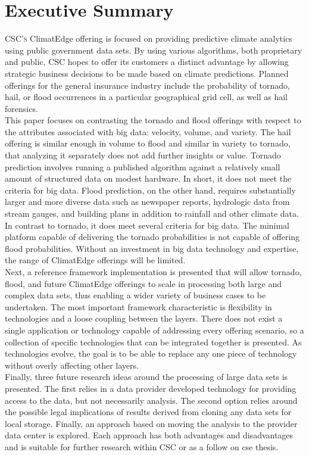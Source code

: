 \section{Executive Summary}
\textsc{CSC's} ClimatEdge\texttrademark{} offering is focused on providing predictive climate analytics using public government data sets. By using various algorithms, both proprietary and public, \textsc{CSC} hopes to offer its customers a distinct advantage by allowing strategic business decisions to be made based on climate predictions. Planned offerings for the general insurance industry include the probability of tornado, hail, or flood occurrences in a particular geographical grid cell, as well as hail forensics. \\

This paper focuses on contrasting the tornado and flood offerings with respect to the attributes associated with big data: velocity, volume, and variety. The hail offering is similar enough in volume to flood and similar in variety to tornado, that analyzing it separately does not add further insights or value. Tornado prediction involves running a published algorithm against a relatively small amount of structured data on modest hardware. In short, it does not meet the criteria for big data. Flood prediction, on the other hand, requires substantially larger and more diverse data such as newspaper reports, hydrologic data from stream gauges, and building plans in addition to rainfall and other climate data.  In contrast to tornado, it does meet several criteria for big data. The minimal platform capable of delivering the tornado probabilities is not capable of offering flood probabilities. Without an investment in big data technology and expertise, the range of ClimatEdge\texttrademark{} offerings will be limited.\\

Next, a reference framework implementation is presented that will allow tornado, flood, and future ClimatEdge\texttrademark{} offerings to scale in processing both large and complex data sets, thus enabling a wider variety of business cases to be undertaken. The most important framework characteristic is flexibility in technologies and a loose coupling between the layers. There does not exist a single application or technology capable of addressing every offering scenario, so a collection of specific technologies that can be integrated together is presented. As technologies evolve, the goal is to be able to replace any one piece of technology without overly affecting other layers.\\

Finally, three future research ideas around the processing of large data sets is presented. The first relies in a data provider developed technology for providing access to the data, but not necessarily analysis.  The second option relies around the possible legal implications of results derived from cloning any data sets for local storage. Finally, an approach based on moving the analysis to the provider data center is explored. Each approach has both advantages and disadvantages and is suitable for further research within \textsc{CSC} or as a follow on \gls{cse} thesis.